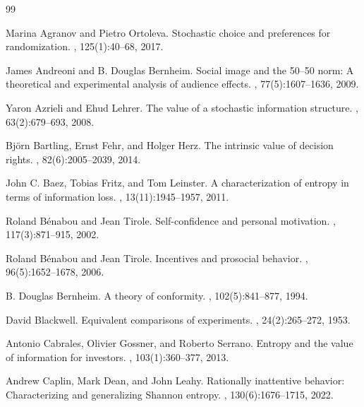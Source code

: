 \documentclass[11pt,a4paper]{article}
\theoremstyle{definition}
\newcommand{\1}{\mathbf 1}
\begin{document}
\clearpage
\begin{thebibliography}{99}
\raggedright

Marina Agranov and Pietro Ortoleva.
\newblock Stochastic choice and preferences for randomization.
, 125(1):40--68, 2017.

James Andreoni and B. Douglas Bernheim.
\newblock Social image and the 50--50 norm: A theoretical and experimental analysis of audience effects.
, 77(5):1607--1636, 2009.

Yaron Azrieli and Ehud Lehrer.
\newblock The value of a stochastic information structure.
, 63(2):679--693, 2008.

Bj\"orn Bartling, Ernst Fehr, and Holger Herz.
\newblock The intrinsic value of decision rights.
, 82(6):2005--2039, 2014.

John C. Baez, Tobias Fritz, and Tom Leinster.
\newblock A characterization of entropy in terms of information loss.
, 13(11):1945--1957, 2011.

Roland B\'enabou and Jean Tirole.
\newblock Self-confidence and personal motivation.
, 117(3):871--915, 2002.

Roland B\'enabou and Jean Tirole.
\newblock Incentives and prosocial behavior.
, 96(5):1652--1678, 2006.

B. Douglas Bernheim.
\newblock A theory of conformity.
, 102(5):841--877, 1994.

David Blackwell.
\newblock Equivalent comparisons of experiments.
, 24(2):265--272, 1953.


Antonio Cabrales, Olivier Gossner, and Roberto Serrano.
\newblock Entropy and the value of information for investors.
, 103(1):360--377, 2013.

Andrew Caplin, Mark Dean, and John Leahy.
\newblock Rationally inattentive behavior: Characterizing and generalizing {S}hannon entropy.
, 130(6):1676--1715, 2022.


\end{thebibliography}
\end{document}
